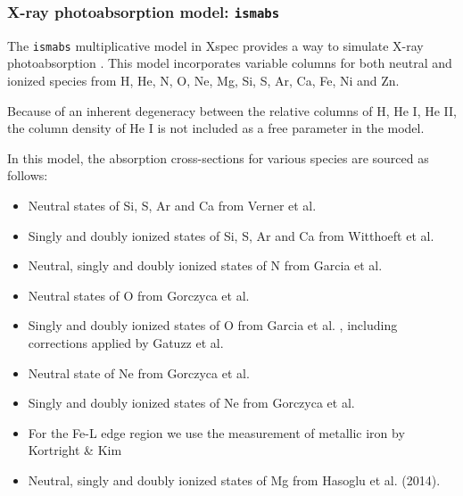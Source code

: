 			\subsubsection{X-ray photoabsorption model: \texttt{ismabs}}
			The \texttt{ismabs} multiplicative model in Xspec provides a way to simulate X-ray photoabsorption \cite{ismabs_gatuzz}. This model incorporates variable columns for both neutral and ionized species from H, He, N, O, Ne, Mg, Si, S, Ar, Ca, Fe, Ni and Zn.
			
			Because of an inherent degeneracy between the relative columns of H, He I, He II, the column density of He I is not included as a free parameter in the model.
			
			In this model, the absorption cross-sections for various species are sourced as follows:
			\begin{itemize}
				\item Neutral states of Si, S, Ar and Ca from Verner et al. \cite{vernerXS}
				\item Singly and doubly ionized states of Si, S, Ar and Ca from Witthoeft et al. \cite{witthoeftXS1,witthoeftXS2}
				\item Neutral, singly and doubly ionized states of N from Garcia et al. \cite{garciaXS1}
				\item Neutral states of O from Gorczyca et al. \cite{gorczycaXS1}
				\item Singly and doubly ionized states of O from Garcia et al. \cite{garciaXS2}, including corrections applied by Gatuzz et al. \cite{gatuzzXS}
				\item Neutral state of Ne from Gorczyca et al. \cite{gorczycaXS2}
				\item Singly and doubly ionized states of Ne from Gorczyca et al. \cite{gorczycaXS3}
				\item For the Fe-L edge region we use the measurement of metallic iron by Kortright \& Kim \cite{kortrightXS}
				\item Neutral, singly and doubly ionized states of Mg from Hasoglu et al. (2014).
			\end{itemize}
			

